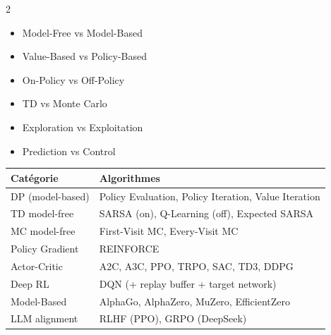 \documentclass[11pt,a4paper]{article}
\begin{document}
\begin{formbox}
\begin{multicols}{2}
\begin{itemize}[nosep]
\item Model-Free vs Model-Based
\item Value-Based vs Policy-Based
\item On-Policy vs Off-Policy
\item TD vs Monte Carlo
\item Exploration vs Exploitation
\item Prediction vs Control
\end{itemize}
\end{multicols}
\end{formbox}

\begin{formbox}
\renewcommand{\arraystretch}{1.3}
\begin{tabular}{@{}l l@{}}
\toprule
\textbf{Catégorie} & \textbf{Algorithmes} \\
\midrule
DP (model-based) & Policy Evaluation, Policy Iteration, Value Iteration \\
TD model-free & SARSA (on), Q-Learning (off), Expected SARSA \\
MC model-free & First-Visit MC, Every-Visit MC \\
Policy Gradient & REINFORCE \\
Actor-Critic & A2C, A3C, PPO, TRPO, SAC, TD3, DDPG \\
Deep RL & DQN (+ replay buffer + target network) \\
Model-Based & AlphaGo, AlphaZero, MuZero, EfficientZero \\
LLM alignment & RLHF (PPO), GRPO (DeepSeek) \\
\bottomrule
\end{tabular}
\end{formbox}
\end{document}
